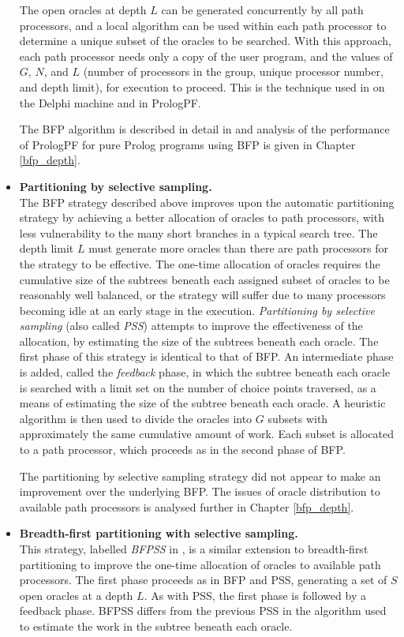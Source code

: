 \begin{itemize}
{  The open oracles at depth $L$ can be generated concurrently by all path processors,
  and a local algorithm can be used within each path processor to determine a unique subset
  of the oracles to be searched.  With this approach, each path processor needs only a
  copy of the user program, and the values of $G$, $N$, and $L$ (number of processors in
  the group, unique processor number, and depth limit), for execution to proceed.  This
  is the technique used in \cite{Sar95} on the Delphi machine and in PrologPF.

  The BFP algorithm is described in detail in \cite{Sar95} and analysis of the
  performance of PrologPF for pure Prolog programs using BFP is given in Chapter
  \ref{bfp_depth}.
  }
\item{\textbf{Partitioning by selective sampling.} \cite{Sar95}\\
  The BFP strategy described above improves upon the automatic partitioning strategy by
  achieving a better allocation of oracles to path processors, with less vulnerability to
  the many short branches in a typical search tree. The depth limit $L$ must generate
  more oracles than there are path processors for the strategy to be effective.  The
  one-time allocation of oracles requires the cumulative size of the subtrees beneath
  each assigned subset of oracles to be reasonably well balanced, or the strategy will
  suffer due to many processors becoming idle at an early stage in the execution.
  \textit{Partitioning by
  selective sampling} (also called \textit{PSS}) 
  attempts to improve the effectiveness of the allocation, by
  estimating the size of the subtrees beneath each oracle.  The first phase of
  this strategy is identical to that of BFP.  An intermediate phase is added, called
  the \textit{feedback} phase, in which the subtree beneath
  each oracle is searched with a limit set on the number of choice points traversed, as
  a means of estimating the size of the subtree beneath each oracle.  A heuristic
  algorithm \cite{Sar95} is then used to divide the oracles into $G$ subsets with
  approximately the same cumulative amount of work.  Each subset is allocated to a
  path processor, which proceeds as in the second phase of BFP.

  The partitioning by selective sampling
  strategy did not appear to make an improvement over the underlying BFP.
  The issues of oracle distribution
  to available path processors is analysed further in Chapter \ref{bfp_depth}.  
  }
\item{\textbf{Breadth-first partitioning with selective sampling.} \cite{Sar95}\\
  This strategy, labelled \textit{BFPSS} in \cite{Sar95}, is a similar extension to
  breadth-first partitioning to improve the one-time allocation of oracles to
  available path processors.  The first phase proceeds as in BFP and  PSS, generating
  a set of $S$ open oracles at a depth $L$.  As with PSS, the first phase is followed
  by a feedback phase.  BFPSS differs from the previous PSS in the algorithm used
  to estimate the work in the subtree beneath each oracle.

}
\end{itemize}
